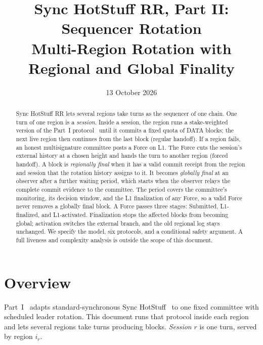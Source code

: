 \documentclass[11pt,a4paper]{article}
\title{Sync HotStuff RR, Part II: Sequencer Rotation\\\large Multi-Region Rotation with Regional and Global Finality}
\author{}\date{13 October 2026}
\newcommand{\defterm}[1]{\textcolor{rrBlue}{\textit{#1}}}
\newcounter{protocol}
\begin{document}
\maketitle
\begin{abstract}
Sync HotStuff RR lets several regions take turns as the
sequencer of one chain. One turn of one region is a \defterm{session}.
Inside a session, the region runs a stake-weighted version of the
Part~I protocol~\cite{part1} until it commits a fixed quota of DATA blocks;
the next live region then continues from the last block (regular
handoff). If a region fails, an honest multisignature committee posts a
Force on L1. The Force cuts the session's external history at a chosen
height and hands the turn to another region (forced handoff). A block is
\defterm{regionally final} when it has a valid commit receipt from the
region and session that the rotation history assigns to it. It becomes
\defterm{globally final} at an observer after a further waiting period,
which starts when the observer relays the complete commit evidence to
the committee. The period covers the committee's monitoring, its
decision window, and the L1 finalization of any Force, so a valid Force
never removes a globally final block. A Force passes three stages:
Submitted, L1-finalized, and L1-activated. Finalization stops the
affected blocks from becoming global; activation switches the external
branch, and the old regional log stays unchanged. We specify the model, six
protocols, and a conditional safety argument. A full liveness and
complexity analysis is outside the scope of this document.
\end{abstract}

\section{Overview}
\label{sec:overview}
Part~I~\cite{part1} adapts standard-synchronous Sync
HotStuff~\cite{sync} to one fixed committee with scheduled leader
rotation. This document runs that protocol inside each region and lets
several regions take turns producing blocks. \defterm{Session} $r$ is one turn,
served by region $i_r$.
\end{document}
